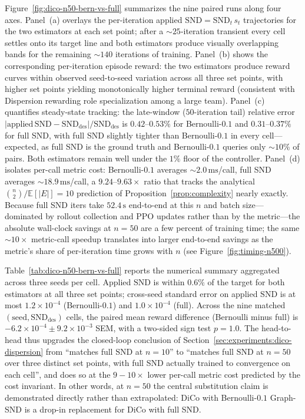 \documentclass{article}
\theoremstyle{plain}
\theoremstyle{definition}
\theoremstyle{remark}
\newcommand{\SND}{\ensuremath{\mathrm{SND}}}
\begin{document}
Figure~\ref{fig:dico-n50-bern-vs-full} summarizes the nine paired
runs along four axes. Panel~(a) overlays the per-iteration applied
$\SND{=}\SND_t\,s_t$ trajectories for the two estimators at each set
point; after a ${\sim}25$-iteration transient every cell settles
onto its target line and both estimators produce visually
overlapping bands for the remaining ${\sim}140$ iterations of
training. Panel~(b) shows the corresponding per-iteration episode
reward: the two estimators produce reward curves within observed
seed-to-seed variation across all three set points, with higher set points
yielding monotonically higher terminal reward (consistent with
Dispersion rewarding role specialization among a large team).
Panel~(c) quantifies steady-state tracking: the late-window
($50$-iteration tail) relative error
$|\mathrm{applied}\,\SND - \SND_{\mathrm{des}}|/\SND_{\mathrm{des}}$
is $0.42$--$0.53\%$ for Bernoulli-$0.1$ and $0.31$--$0.37\%$ for
full SND, with full SND slightly tighter than Bernoulli-$0.1$ in
every cell---expected, as full SND is the ground truth and
Bernoulli-$0.1$ queries only ${\sim}10\%$ of pairs. Both estimators
remain well under the $1\%$ floor of the controller. Panel~(d)
isolates per-call metric cost: Bernoulli-$0.1$ averages
${\sim}2.0\,\mathrm{ms}$/call, full SND averages
${\sim}18.9\,\mathrm{ms}$/call, a $9.24$--$9.63\times$ ratio that
tracks the analytical $\binom{n}{2}/\mathbb{E}[|E|]{=}10$ prediction
of Proposition~\ref{prop:complexity} nearly exactly. Because full
SND iters take $52.4\,\mathrm{s}$ end-to-end at this $n$ and batch
size---dominated by rollout collection and PPO updates rather than
by the metric---the absolute wall-clock savings at $n{=}50$ are a
few percent of training time; the same ${\sim}10{\times}$
metric-call speedup translates into larger end-to-end savings as the
metric's share of per-iteration time grows with $n$ (see
Figure~\ref{fig:timing-n500}).

Table~\ref{tab:dico-n50-bern-vs-full} reports the numerical summary
aggregated across three seeds per cell. Applied $\SND$ is within
$0.6\%$ of the target for both estimators at all three set points;
cross-seed standard error on applied $\SND$ is at most
$1.2\times 10^{-4}$ (Bernoulli-$0.1$) and $1.0\times 10^{-4}$
(full). Across the nine matched $(\mathrm{seed},\SND_{\mathrm{des}})$
cells, the paired mean reward difference (Bernoulli minus full) is
$-6.2{\times}10^{-4}\pm9.2{\times}10^{-3}$ SEM, with a two-sided sign
test $p{=}1.0$. The head-to-head
thus upgrades the closed-loop conclusion of
Section~\ref{sec:experiments:dico-dispersion} from ``matches full
$\SND$ at $n{=}10$'' to ``matches full $\SND$ at $n{=}50$ over three
distinct set points, with full SND actually trained to convergence
on each cell'', and does so at the $9{-}10\times$ lower per-call
metric cost predicted by the cost invariant. In other words, at
$n{=}50$ the central substitution claim is demonstrated directly
rather than extrapolated: DiCo with Bernoulli-$0.1$ Graph-SND is a
drop-in replacement for DiCo with full SND.
\end{document}

